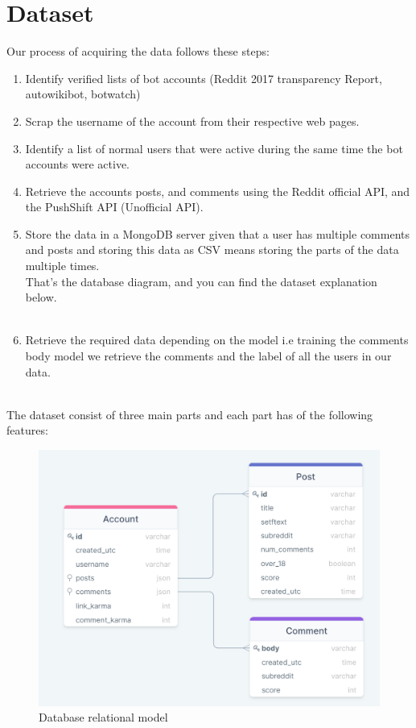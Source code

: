 \documentclass{article}
\begin{document}
\section{Dataset}
Our process of acquiring the data follows these steps:
    \begin{enumerate}
        \item Identify verified lists of bot accounts (Reddit 2017 transparency Report, autowikibot, botwatch)
        \item Scrap the username of the account from their respective web pages.
        \item Identify a list of normal users that were active during the same time the bot accounts were active.
        \item Retrieve the accounts posts, and comments using the Reddit official API, and the PushShift API (Unofficial API).
        \item Store the data in a MongoDB server given that a user has multiple comments and posts and storing this data as CSV means storing the parts of the data multiple times.\\
        That's the database diagram, and you can find the dataset explanation below.\\ \\
        \item Retrieve the required data depending on the model i.e training the comments body model we retrieve the comments and the label of all the users in our data. \\ \\
    \end{enumerate}
The dataset consist of three main parts and each part has of the following features:
    \begin{figure}[H]
        \centering
        \includegraphics[width=\textwidth,height=\textheight,keepaspectratio]{db}
        \caption{Database relational model}
    \end{figure}
\end{document}
